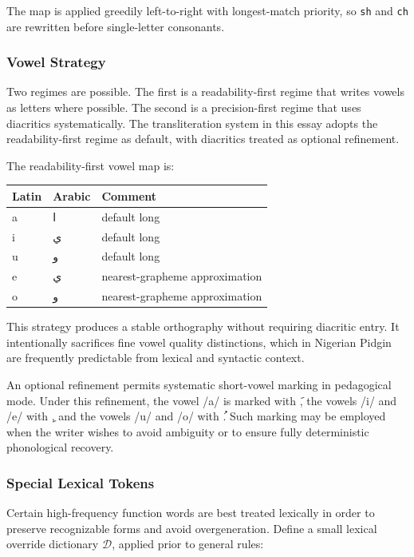 \documentclass[12pt]{article}
\newcommand{\AR}[1]{\foreignlanguage{arabic}{#1}}
\begin{document}
The map is applied greedily left-to-right with longest-match priority, so \texttt{sh} and \texttt{ch} are rewritten before single-letter consonants.

\subsubsection{Vowel Strategy}

Two regimes are possible. The first is a readability-first regime that writes vowels as letters where possible. The second is a precision-first regime that uses diacritics systematically. The transliteration system in this essay adopts the readability-first regime as default, with diacritics treated as optional refinement.

The readability-first vowel map is:

\begin{center}
\begin{tabular}{lll}
Latin & Arabic & Comment \\
\hline
a & \AR{ا} & default long \\
i & \AR{ي} & default long \\
u & \AR{و} & default long \\
e & \AR{ي} & nearest-grapheme approximation \\
o & \AR{و} & nearest-grapheme approximation \\
\end{tabular}
\end{center}

This strategy produces a stable orthography without requiring diacritic entry. It intentionally sacrifices fine vowel quality distinctions, which in Nigerian Pidgin are frequently predictable from lexical and syntactic context.

An optional refinement permits systematic short-vowel marking in pedagogical mode. Under this refinement, the vowel /a/ is marked with \AR{َ}, the vowels /i/ and /e/ with \AR{ِ}, and the vowels /u/ and /o/ with \AR{ُ}. Such marking may be employed when the writer wishes to avoid ambiguity or to ensure fully deterministic phonological recovery.

\subsubsection{Special Lexical Tokens}

Certain high-frequency function words are best treated lexically in order to preserve recognizable forms and avoid overgeneration. Define a small lexical override dictionary $\mathcal{D}$, applied prior to general rules:
\end{document}
